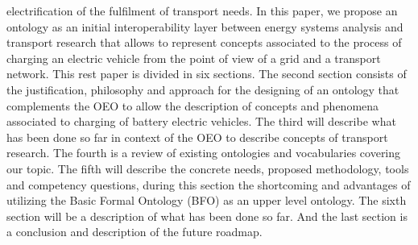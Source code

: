 electrification of the fulfilment of transport needs. In this paper, we propose
an ontology as an initial interoperability layer between energy systems
analysis and transport research that allows to represent concepts associated to
the process of charging an electric vehicle from the point of view of a grid
and a transport network. This rest paper is divided in six sections. The second
section consists of the justification, philosophy and approach for the
designing of an ontology that complements the OEO to allow the description of
concepts and phenomena associated to charging of battery electric vehicles. The
third will describe what has been done so far in context of the OEO to describe
concepts of transport research. The fourth is a review of existing ontologies
and vocabularies covering our topic.  The fifth will describe the concrete
needs, proposed methodology, tools and competency questions, during this
section the shortcoming and advantages of utilizing the Basic Formal Ontology
(BFO) \cite{Arp.2015} as an upper level ontology. The sixth section will be a
description of what has been done so far. And the last section is a conclusion
and description of the future roadmap.

